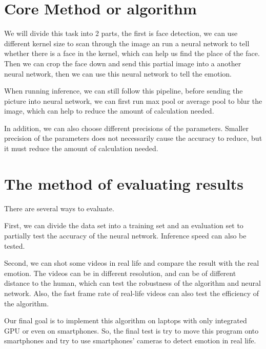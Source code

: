 \documentclass[10pt,twocolumn,letterpaper]{article}
\begin{document}
\section{Core Method or algorithm}
We will divide this task into 2 parts, the first is face detection, we can use different kernel size to scan through the image an run a neural network to tell whether there is a face in the kernel, which can help us find the place of the face. Then we can crop the face down and send this partial image into a another neural network, then we can  use this neural network to tell the emotion.

When running inference, we can still follow this pipeline, before sending the picture into neural network, we can first run max pool or average pool to blur the image, which can help to reduce the amount of calculation needed.

In addition, we can also choose different precisions of the parameters. Smaller precision of the parameters does not necessarily cause the accuracy to reduce, but it must reduce the amount of calculation needed.

\section{The method of evaluating results}
There are several ways to evaluate. 

First, we can divide the data set into a training set and an evaluation set to partially test the accuracy of the neural network. Inference speed can also be tested.

Second, we can shot some videos in real life and compare the result with the real emotion. The videos can be in different resolution, and can be of different distance to the human, which can test the robustness of the algorithm and neural network. Also, the fast frame rate of real-life videos can also test the efficiency of the algorithm.

Our final goal is to implement this algorithm on laptops with only integrated GPU or even on smartphones. So, the final test is try to move this program onto smartphones and try to use smartphones' cameras to detect emotion in real life.

{
\small


}
\end{document}

